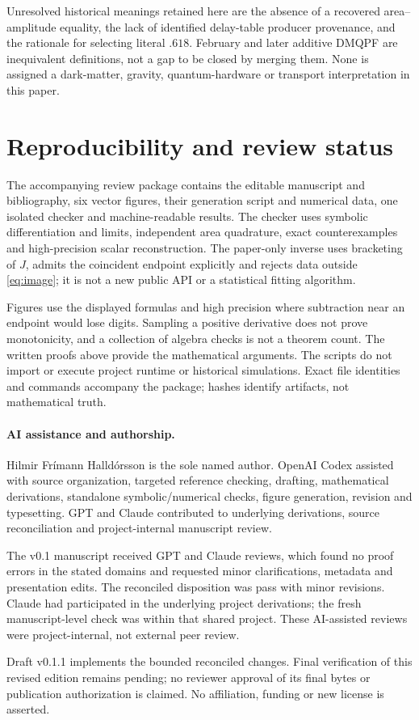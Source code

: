 \documentclass[11pt,a4paper]{article}
\theoremstyle{definition}
\begin{document}
Unresolved historical meanings retained here are the absence of a recovered area--amplitude equality, the lack of identified delay-table producer provenance, and the rationale for selecting literal \(.618\). February and later additive DMQPF are inequivalent definitions, not a gap to be closed by merging them. None is assigned a dark-matter, gravity, quantum-hardware or transport interpretation in this paper.

\section{Reproducibility and review status}\label{app:repro}
The accompanying review package contains the editable manuscript and bibliography, six vector figures, their generation script and numerical data, one isolated checker and machine-readable results. The checker uses symbolic differentiation and limits, independent area quadrature, exact counterexamples and high-precision scalar reconstruction. The paper-only inverse uses bracketing of \(J\), admits the coincident endpoint explicitly and rejects data outside \eqref{eq:image}; it is not a new public API or a statistical fitting algorithm.

Figures use the displayed formulas and high precision where subtraction near an endpoint would lose digits. Sampling a positive derivative does not prove monotonicity, and a collection of algebra checks is not a theorem count. The written proofs above provide the mathematical arguments. The scripts do not import or execute project runtime or historical simulations. Exact file identities and commands accompany the package; hashes identify artifacts, not mathematical truth.

\paragraph{AI assistance and authorship.}
Hilmir Fr\'imann Halld\'orsson is the sole named author. OpenAI Codex assisted with source organization, targeted reference checking, drafting, mathematical derivations, standalone symbolic/numerical checks, figure generation, revision and typesetting. GPT and Claude contributed to underlying derivations, source reconciliation and project-internal manuscript review.

The v0.1 manuscript received GPT and Claude reviews, which found no proof errors in the stated domains and requested minor clarifications, metadata and presentation edits. The reconciled disposition was pass with minor revisions. Claude had participated in the underlying project derivations; the fresh manuscript-level check was within that shared project. These AI-assisted reviews were project-internal, not external peer review.

Draft v0.1.1 implements the bounded reconciled changes. Final verification of this revised edition remains pending; no reviewer approval of its final bytes or publication authorization is claimed. No affiliation, funding or new license is asserted.



\end{document}
